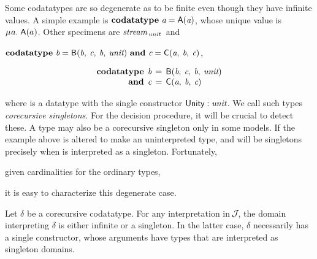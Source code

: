 


{
Some codatatypes are so degenerate as to be finite even though they
have infinite values. A simple example is
\vthinspace$\textbf{codatatype}~\textit{a} = \textsf{A}(\textit{a})$, whose
unique value is $\MU a.\; \const{A}(a)$. Other specimens are
$\textit{stream}_{\,\textit{unit}\,}$
and
\begin{conf}%
\vthinspace$\textbf{codatatype}~\textit{b} = \textsf{B}(\textit{b},\: \textit{c},\: \textit{b},\: \textit{unit})
~\textbf{and}~ \textit{c} = \textsf{C}(\textit{a},\: \textit{b},\: \textit{c})$,
\end{conf}%
\begin{rep}%
\[\begin{aligned}[t]
      \textbf{codatatype}\;\, \textit{b} & \,=\, \textsf{B}(\textit{b},\: \textit{c},\: \textit{b},\: \textit{unit}) \\[-1\jot]
      \textbf{and}\;\, \textit{c} & \,=\, \textsf{C}(\textit{a},\: \textit{b},\: \textit{c})
\end{aligned}
\]
\end{rep}%
where  is a datatype with the single constructor $\textsf{Unity} :
\textit{unit}$. We call such types
\emph{corecursive singletons}. For the decision procedure, it will be
crucial to detect these. %
A type may also be a corecursive singleton only in some models. If the example
above is altered to make  an uninterpreted type,  and  will be
singletons precisely when  is interpreted as a singleton.
Fortunately, \begin{rep}given cardinalities for the ordinary types, \end{rep}%
it is easy to characterize this degenerate case.

}

\begin{lemma}%
\label{lem:corecursive-singletons}%
\afterDot
Let $\delta$ be a corecursive codatatype. For any interpretation in $\mathcal{\!J\!}$,
the domain interpreting $\delta$ is either infinite or a singleton. In the
latter case, $\delta$ necessarily has a single constructor, whose arguments have
types that are interpreted as singleton domains.
\end{lemma}

